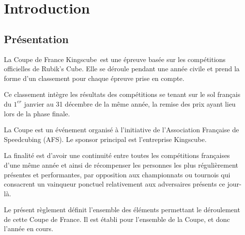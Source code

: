\documentclass[10pt,a4paper]{article}
\newcommand{\cdf}{Coupe de France Kingscube}
\newcommand{\3}{$3\times3$}
\newcommand{\4}{$4\times4$}
\newcommand{\2}{$2\times2$}
\begin{document}



\pagebreak


\pagebreak

\section{Introduction}
\subsection{Présentation}

La \cdf\ est une épreuve basée sur les compétitions officielles de Rubik's Cube. Elle se déroule pendant une année civile et prend la forme d'un classement pour chaque épreuve prise en compte.

Ce classement intègre les résultats des compétitions se tenant sur le sol français du $1^{er}$ janvier au 31 décembre de la même année, la remise des prix ayant lieu lors de la phase finale.

La Coupe est un événement organisé à l'initiative de l'Association Française de Speedcubing (AFS). Le sponsor principal est l'entreprise Kingscube. 

La finalité est d'avoir une continuité entre toutes les compétitions françaises d'une même année et ainsi de récompenser les personnes les plus régulièrement présentes et performantes, par opposition aux championnats ou tournois qui consacrent un vainqueur ponctuel relativement aux adversaires présents ce jour-là.

Le présent règlement définit l'ensemble des éléments permettant le déroulement de cette Coupe de France. Il est établi pour l'ensemble de la Coupe, et donc l'année en cours.
\end{document}
